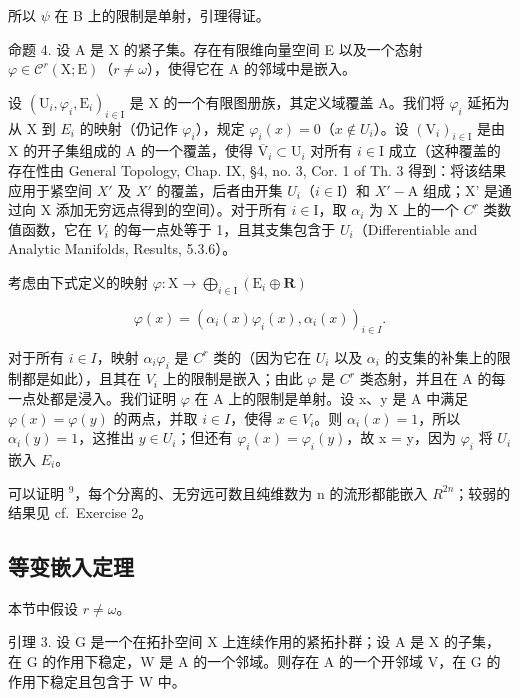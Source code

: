 所以 \(\psi\) 在 B 上的限制是单射，引理得证。

命题 4. 设 A 是 X 的紧子集。存在有限维向量空间 E 以及一个态射 \(\varphi \in \mathcal{C}^r (\mathrm{X};\mathrm{E})\)（\(r\neq \omega\)），使得它在 A 的邻域中是嵌入。

设 \((\mathrm{U}_{i},\varphi_{i},\mathrm{E}_{i})_{i\in\mathrm{I}}\) 是 X 的一个有限图册族，其定义域覆盖 A。我们将 \(\varphi_{i}\) 延拓为从 X 到 \(E_{i}\) 的映射（仍记作 \(\varphi_{i}\)），规定 \(\varphi_{i}(x)=0\)（\(x\notin U_{i}\)）。设 \((\mathrm{V}_{i})_{i\in\mathrm{I}}\) 是由 X 的开子集组成的 A 的一个覆盖，使得 \(\overline{\mathrm{V}}_{i}\subset\mathrm{U}_{i}\) 对所有 \(i\in\mathrm{I}\) 成立（这种覆盖的存在性由 General Topology, Chap. IX, §4, no. 3, Cor. 1 of Th. 3 得到：将该结果应用于紧空间 \(X'\) 及 \(X'\) 的覆盖，后者由开集 \(U_{i}\)（\(i\in\mathrm{I}\)）和 \(X'-\mathrm{A}\) 组成；X' 是通过向 X 添加无穷远点得到的空间）。对于所有 \(i\in\mathrm{I}\)，取 \(\alpha_{i}\) 为 X 上的一个 \(C^{r}\) 类数值函数，它在 \(V_{i}\) 的每一点处等于 1，且其支集包含于 \(U_{i}\)（Differentiable and Analytic Manifolds, Results, 5.3.6）。

考虑由下式定义的映射 \(\varphi : \mathrm{X} \to \bigoplus_{i \in \mathrm{I}} (\mathrm{E}_i \oplus \mathbf{R})\)

\[
\varphi (x) = (\alpha_ {i} (x) \varphi_ {i} (x), \alpha_ {i} (x)) _ {i \in I}.
\]

对于所有 \(i \in I\)，映射 \(\alpha_{i}\varphi_{i}\) 是 \(C^{r}\) 类的（因为它在 \(U_{i}\) 以及 \(\alpha_{i}\) 的支集的补集上的限制都是如此），且其在 \(V_{i}\) 上的限制是嵌入；由此 \(\varphi\) 是 \(C^{r}\) 类态射，并且在 A 的每一点处都是浸入。我们证明 \(\varphi\) 在 A 上的限制是单射。设 x、y 是 A 中满足 \(\varphi(x) = \varphi(y)\) 的两点，并取 \(i \in I\)，使得 \(x \in V_{i}\)。则 \(\alpha_{i}(x) = 1\)，所以 \(\alpha_{i}(y) = 1\)，这推出 \(y \in U_{i}\)；但还有 \(\varphi_{i}(x) = \varphi_{i}(y)\)，故 x = y，因为 \(\varphi_{i}\) 将 \(U_{i}\) 嵌入 \(E_{i}\)。

可以证明 \(^{9}\)，每个分离的、无穷远可数且纯维数为 n 的流形都能嵌入 \(R^{2n}\)；较弱的结果见 cf.~Exercise 2。

\subsection{等变嵌入定理}

本节中假设 \(r \neq \omega\)。

引理 3. 设 G 是一个在拓扑空间 X 上连续作用的紧拓扑群；设 A 是 X 的子集，在 G 的作用下稳定，W 是 A 的一个邻域。则存在 A 的一个开邻域 V，在 G 的作用下稳定且包含于 W 中。

